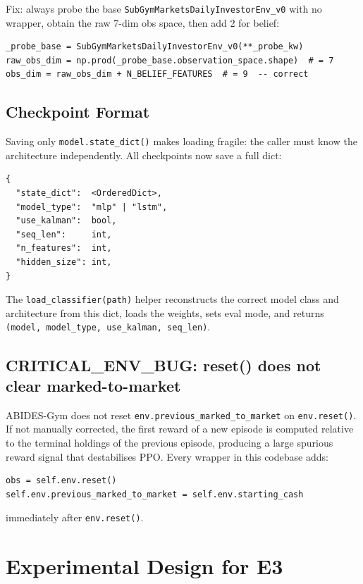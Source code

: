 \documentclass[11pt]{article}
\begin{document}
Fix: always probe the base \texttt{SubGymMarketsDailyInvestorEnv\_v0} with no
wrapper, obtain the raw 7-dim obs space, then add 2 for belief:

\begin{verbatim}
_probe_base = SubGymMarketsDailyInvestorEnv_v0(**_probe_kw)
raw_obs_dim = np.prod(_probe_base.observation_space.shape)  # = 7
obs_dim = raw_obs_dim + N_BELIEF_FEATURES  # = 9  -- correct
\end{verbatim}

\subsection{Checkpoint Format}

Saving only \texttt{model.state\_dict()} makes loading fragile: the caller
must know the architecture independently.  All checkpoints now save a full
dict:

\begin{verbatim}
{
  "state_dict":  <OrderedDict>,
  "model_type":  "mlp" | "lstm",
  "use_kalman":  bool,
  "seq_len":     int,
  "n_features":  int,
  "hidden_size": int,
}
\end{verbatim}

\noindent
The \texttt{load\_classifier(path)} helper reconstructs the correct model
class and architecture from this dict, loads the weights, sets eval mode, and
returns \texttt{(model, model\_type, use\_kalman, seq\_len)}.

\subsection{CRITICAL\_ENV\_BUG: reset() does not clear marked-to-market}

ABIDES-Gym does not reset \texttt{env.previous\_marked\_to\_market} on
\texttt{env.reset()}.  If not manually corrected, the first reward of a new
episode is computed relative to the terminal holdings of the previous episode,
producing a large spurious reward signal that destabilises PPO.  Every wrapper
in this codebase adds:

\begin{verbatim}
obs = self.env.reset()
self.env.previous_marked_to_market = self.env.starting_cash
\end{verbatim}

immediately after \texttt{env.reset()}.

\section{Experimental Design for E3}
\end{document}
